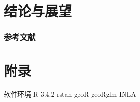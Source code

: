 \documentclass[10pt,aspectratio=43,compress,xcolor=x11names,UTF8]{beamer}
\begin{document}
\section{结论与展望}

\begin{frame}

\end{frame}



\begin{frame}[allowframebreaks]
\frametitle{参考文献}


\end{frame}

\appendix

\section*{附录}

\begin{frame}{软件环境}
R 3.4.2
rstan
geoR
geoRglm
INLA
\end{frame}



\end{document}

